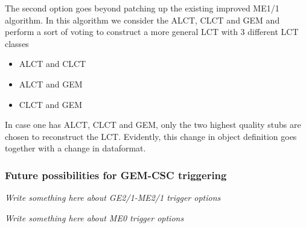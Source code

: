 The second option goes beyond patching up the existing improved ME1/1 algorithm. In this algorithm we consider the ALCT, CLCT and GEM and perform a sort of voting to construct a more general LCT with 3 different LCT classes
\begin{itemize}
\item ALCT and CLCT
\item ALCT and GEM
\item CLCT and GEM
\end{itemize}
In case one has ALCT, CLCT and GEM, only the two highest quality stubs are chosen to reconstruct the LCT. Evidently, this change in object definition goes together with a change in dataformat. 

\subsubsection{Future possibilities for GEM-CSC triggering}
\label{subsec:future_possibilities_for_gem_csc_triggering}

\textit{Write something here about GE2/1-ME2/1 trigger options}

\textit{Write something here about ME0 trigger options}

\newpage
